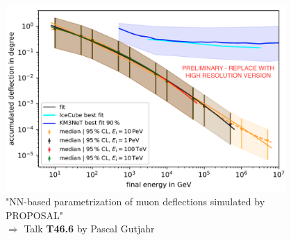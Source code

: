 \begin{frame}[c]
\begin{columns}[onlytextwidth]
\begin{column}{0.45\textwidth}
    \end{column}
        \begin{column}{0.55\textwidth}
    		\begin{figure}
    		  \includegraphics[width=\linewidth, height=.65\textheight, keepaspectratio]{plots/deflections.png}
    		  \captionsetup{justification=centering}
    		  \caption*{"NN-based parametrization of muon deflections simulated by PROPOSAL" \\ $\Rightarrow$ Talk \textbf{T46.6} by Pascal Gutjahr}
    		\end{figure}

        \end{column}
    \end{columns}
\end{frame}
